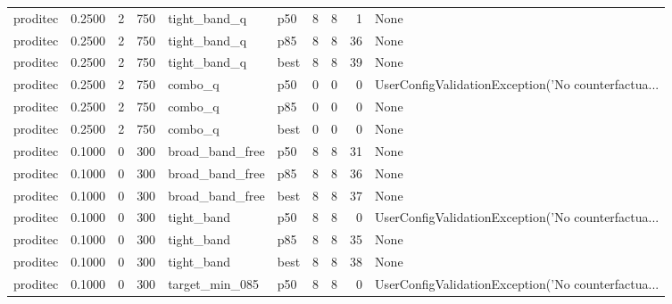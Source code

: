 \begin{tabular}{lrrrllrrrl}
proditec &    0.2500 &    2 &    750 &         tight\_band\_q &    p50 &               8 &          8 &       1 &                                               None \\
proditec &    0.2500 &    2 &    750 &         tight\_band\_q &    p85 &               8 &          8 &      36 &                                               None \\
proditec &    0.2500 &    2 &    750 &         tight\_band\_q &   best &               8 &          8 &      39 &                                               None \\
proditec &    0.2500 &    2 &    750 &              combo\_q &    p50 &               0 &          0 &       0 & UserConfigValidationException('No counterfactua... \\
proditec &    0.2500 &    2 &    750 &              combo\_q &    p85 &               0 &          0 &       0 &                                               None \\
proditec &    0.2500 &    2 &    750 &              combo\_q &   best &               0 &          0 &       0 &                                               None \\
proditec &    0.1000 &    0 &    300 &      broad\_band\_free &    p50 &               8 &          8 &      31 &                                               None \\
proditec &    0.1000 &    0 &    300 &      broad\_band\_free &    p85 &               8 &          8 &      36 &                                               None \\
proditec &    0.1000 &    0 &    300 &      broad\_band\_free &   best &               8 &          8 &      37 &                                               None \\
proditec &    0.1000 &    0 &    300 &           tight\_band &    p50 &               8 &          8 &       0 & UserConfigValidationException('No counterfactua... \\
proditec &    0.1000 &    0 &    300 &           tight\_band &    p85 &               8 &          8 &      35 &                                               None \\
proditec &    0.1000 &    0 &    300 &           tight\_band &   best &               8 &          8 &      38 &                                               None \\
proditec &    0.1000 &    0 &    300 &       target\_min\_085 &    p50 &               8 &          8 &       0 & UserConfigValidationException('No counterfactua... \\

\end{tabular}
